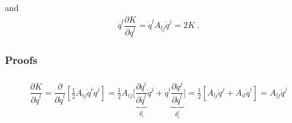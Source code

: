 \documentclass[letterpaper,10pt,english]{jupyterBook}
\begin{document}
\sphinxAtStartPar
and
\begin{equation}\label{equation:ch/lagrange-t-no:eq:lagrange:time:ind:dqdK_dq}
\begin{split}\dot{q}^l \dfrac{\partial K}{\partial \dot{q}^l} = \dot{q}^l A_{lj} \dot{q}^j = 2 K \ .\end{split}
\end{equation}\subsubsection*{Proofs}
\begin{equation*}
\begin{split}\begin{aligned}
  \dfrac{\partial K}{\partial \dot{q}^l} 
    = \dfrac{\partial }{\partial \dot{q}^l} \left[ \frac{1}{2} A_{ij} \dot{q}^i \dot{q}^j \right] 
    = \frac{1}{2} A_{ij} \bigg[ \underbrace{ \dfrac{\partial \dot{q}^i}{\partial \dot{q}^l} }_{\delta^i_l} \dot{q}^j + \dot{q}^i \underbrace{ \dfrac{\partial \dot{q}^j}{\partial \dot{q}^l}}_{\delta^j_l} \bigg]  
    = \frac{1}{2} \left[ A_{lj} \dot{q}^j + A_{il} \dot{q}^i \right]
    = A_{lj} \dot{q}^j
\end{aligned}\end{split}
\end{equation*}
\sphinxstepscope
\end{document}
